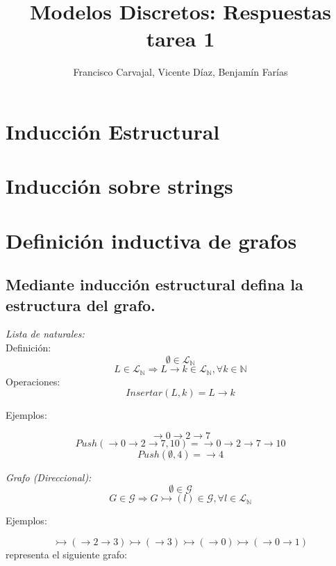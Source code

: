 \documentclass{article}
\title{Modelos Discretos: Respuestas tarea 1}
\author{Francisco Carvajal, Vicente Díaz, Benjamín Farías}
\begin{document}
\maketitle



\section{Inducción Estructural}

\section{Inducción sobre strings}

\section{Definición inductiva de grafos}

\subsection{Mediante inducción estructural defina la estructura del grafo.}
\emph{Lista de naturales:}\\
Definición:
\[ \emptyset \in \mathcal{L}_{\mathbb{N}} \]
\[ L \in \mathcal{L}_\mathbb{N} \Rightarrow L \rightarrow k \in \mathcal{L}_\mathbb{N}, \forall k \in \mathbb{N}\]
Operaciones:
\[ Insertar(L, k) = L \rightarrow k\]


Ejemplos:

\[ \rightarrow 0 \rightarrow 2 \rightarrow 7 \]
\[ Push(\rightarrow 0 \rightarrow 2 \rightarrow 7, 10) =  \rightarrow 0 \rightarrow 2 \rightarrow 7 \rightarrow 10\]
\[ Push(\emptyset, 4) = \rightarrow 4 \]

\emph{Grafo (Direccional):}
\[ \emptyset \in \mathcal{G} \]
\[ G \in \mathcal{G} \Rightarrow G \rightarrowtail (l) \in \mathcal{G} , \forall l \in \mathcal{L}_\mathbb{N} \]

Ejemplos:

\[ \rightarrowtail ( \rightarrow 2 \rightarrow 3) \rightarrowtail (\rightarrow 3) \rightarrowtail (\rightarrow 0) \rightarrowtail (\rightarrow 0 \rightarrow 1) \]
representa el siguiente grafo: 

\begin{center}
\end{center}
\end{document}
